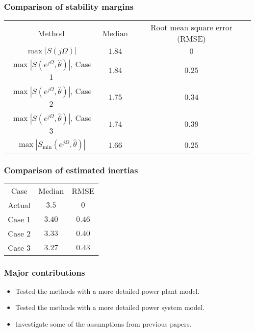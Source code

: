 \begin{frame}
	\frametitle{Comparison of stability margins}
			\begin{tabular}{c c c}
			\toprule
			Method & Median & Root mean square error (RMSE) \\
			$\max |S(j\Omega)|$ & $1.84$ & $0$ \\
			$\max |S(e^{j\Omega},\hat{\theta})|$, Case 1 & $1.84$ & $0.25$ \\
			$\max |S(e^{j\Omega},\hat{\theta})|$, Case 2 & $1.75$ & $0.34$ \\
			$\max |S(e^{j\Omega},\hat{\theta})|$, Case 3 & $1.74$ & $0.39$ \\
			$\max |S_{\min}(e^{j\Omega},\hat{\theta})|$ & $1.66$ & $0.25$ \\
			\bottomrule
	\end{tabular}
\end{frame}
\begin{frame}
	\frametitle{Comparison of estimated inertias}
	\begin{tabular}{c c c}
			\toprule
			Case & Median & RMSE \\
			Actual & $3.5$ & $0$ \\
			Case 1& $3.40$ & $0.46$ \\
			Case 2 & $3.33$ & $0.40$ \\
			Case 3 & $3.27$ & $0.43$ \\
			\bottomrule
	\end{tabular}
\end{frame}
\begin{frame}
	\frametitle{Major contributions}
	\begin{itemize}
		\item Tested the methods with a more detailed power plant model.
		\item Tested the methods  with a more detailed power system model.
		\item Investigate some of the assumptions from previous papers.
	\end{itemize}
\end{frame}

